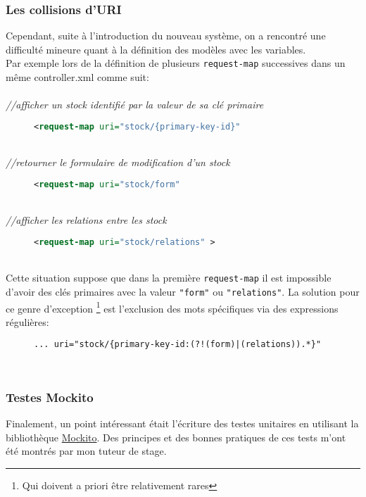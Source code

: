 \subsubsection{Les collisions d'URI}
Cependant, suite à l'introduction du nouveau système, on a rencontré une difficulté mineure quant à la définition des modèles avec les variables.\\
Par exemple lors de la définition de plusieurs \verb|request-map| successives dans un même controller.xml comme suit: \\
\\
\emph{//afficher un stock identifié par la valeur de sa clé primaire}
\begin{figure}[h!]
	\begin{lstlisting}[frame=leftline,language=xml]
<request-map uri="stock/{primary-key-id}" 
\end{lstlisting}
\end{figure}\\   
\emph{//retourner le formulaire de modification d'un stock}
\begin{figure}[h!]
	\begin{lstlisting}[frame=leftline,language=xml]
<request-map uri="stock/form" 
	\end{lstlisting}
\end{figure}\\
\emph{//afficher les relations entre les stock}
\begin{figure}[h!]
	\begin{lstlisting}[frame=leftline,language=xml]
<request-map uri="stock/relations" >
	\end{lstlisting}
\end{figure}  \\
Cette situation suppose que dans la première \verb|request-map| il est impossible d'avoir des clés primaires avec la valeur \verb|"form"| ou \verb|"relations"|. La solution pour ce genre d'exception \footnote{Qui doivent a priori être relativement rares} est l'exclusion des mots spécifiques via des expressions régulières: 
 \begin{figure}[h!]
 	\begin{lstlisting}[frame=leftline,language=xml,frameround=tttt]
... uri="stock/{primary-key-id:(?!(form)|(relations)).*}" 
 	\end{lstlisting}
 \end{figure}  \\


\subsubsection{Testes Mockito}
Finalement, un point intéressant était l'écriture des testes unitaires en utilisant la bibliothèque \href{https://site.mockito.org/}{Mockito}. Des principes et des bonnes pratiques de ces tests m'ont été montrés par mon tuteur de stage. 
